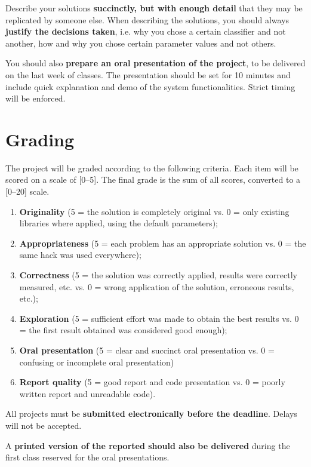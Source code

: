 \documentclass[12pt]{article}
\begin{document}
Describe your solutions \textbf{succinctly, but with enough detail} that they may be
replicated by someone else. When describing the solutions, you should always
\textbf{justify the decisions taken}, i.e. why you chose a certain classifier and not
another, how and why you chose certain parameter values and not others.

You should also \textbf{prepare an oral presentation of the project}, to be
delivered on the last week of classes. The presentation should be set for 10
minutes and include quick explanation and demo of the system
functionalities. Strict timing will be enforced.

\section{Grading}
\label{sec:grading}

The project will be graded according to the following criteria. Each item will
be scored on a scale of [0--5]. The final grade is the sum of all scores,
converted to a [0--20] scale.
\begin{enumerate}
\item \textbf{Originality} (5 = the solution is completely original vs. 0 = only existing libraries where applied, using the default parameters);
\item \textbf{Appropriateness} (5 = each problem has an appropriate solution vs. 0 = the same hack was used everywhere);
\item \textbf{Correctness} (5 = the solution was correctly applied, results were correctly measured, etc. vs. 0 = wrong application of the solution, erroneous results, etc.);
\item \textbf{Exploration} (5 = sufficient effort was made to obtain the best results vs. 0 = the first result obtained was considered good enough);
\item \textbf{Oral presentation} (5 = clear and succinct oral presentation vs. 0 = confusing or incomplete oral presentation)
\item \textbf{Report quality} (5 = good report and code presentation vs. 0 = poorly written report and unreadable code).
\end{enumerate}

All projects must be \textbf{submitted electronically before the deadline}. Delays will
not be accepted.

A \textbf{printed version of the reported should also be delivered} during the first
class reserved for the oral presentations.
\end{document}
